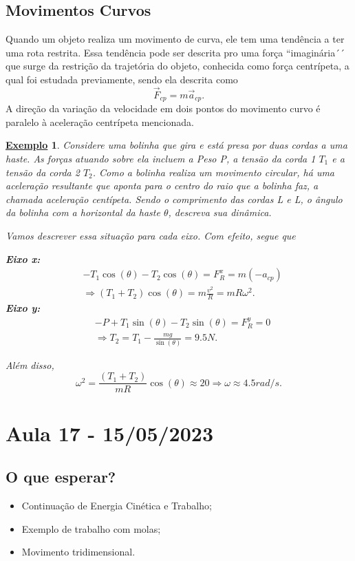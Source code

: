 \documentclass{article}
\newtheorem{example}{\underline{Exemplo}}
\begin{document}
\subsection{Movimentos Curvos}
  Quando um objeto realiza um movimento de curva, ele tem uma tendência
  a ter uma rota restrita. Essa tendência pode ser descrita pro uma for\c ca ``imaginária´´
  que surge da restri\c cão da trajetória do objeto, conhecida como
  for\c ca centrípeta, a qual foi estudada previamente, sendo ela descrita como 
    \[
      \vec{F}_{cp} = m \vec{a}_{cp}.
    \]
    A dire\c cão da varia\c cão da velocidade em dois pontos do movimento curvo 
    é paralelo à acelera\c cão centrípeta mencionada.
   \begin{example}
     Considere uma bolinha que gira e está presa por duas cordas a uma haste.
     As for\c cas atuando sobre ela incluem a Peso P, a tensão da corda 1 \(T_{1}\)
     e a tensão da corda 2 \(T_{2}\). Como a bolinha realiza um movimento circular,
     há uma acelera\c cão resultante que aponta para o centro do raio que a bolinha faz,
     a chamada acelera\c cão centípeta. Sendo o comprimento das cordas L e L, o ângulo
     da bolinha com a horizontal da haste \(\theta \), descreva sua dinâmica.

     Vamos descrever essa situa\c cão para cada eixo. Com efeito, segue que 

     \textbf{Eixo x:}
    \begin{align*}
      &-T_{1}\cos{(\theta )} - T_{2}\cos{(\theta )} = F_{R}^{x} = m(-a_{cp})\\
      &\Rightarrow (T_{1}+T_{2})\cos{(\theta )}=m \frac{v^2}{R} = mR\omega ^2.
    \end{align*}
    \textbf{Eixo y:}
   \begin{align*}
     &-P + T_{1}\sin{(\theta )}-T_{2}\sin{(\theta )}=F_{R}^y = 0\\
     &\Rightarrow T_{2} = T_{1} - \frac{mg}{\sin{(\theta )}} = 9.5N.
   \end{align*}
   
   Além disso, 
     \[
       \omega ^2 = \frac{(T_{1}+T_{2})}{mR}\cos{(\theta )}\approx 20 \Rightarrow \omega \approx 4.5rad/s.
     \]


   \end{example}

\section{Aula 17 - 15/05/2023}
\subsection{O que esperar?}
\begin{itemize}
  \item Continua\c cão de Energia Cinética e Trabalho;
  \item Exemplo de trabalho com molas;
  \item Movimento tridimensional.
\end{itemize}
\end{document}
